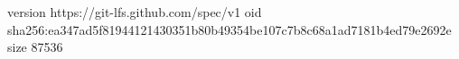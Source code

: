 version https://git-lfs.github.com/spec/v1
oid sha256:ea347ad5f81944121430351b80b49354be107c7b8c68a1ad7181b4ed79e2692e
size 87536
